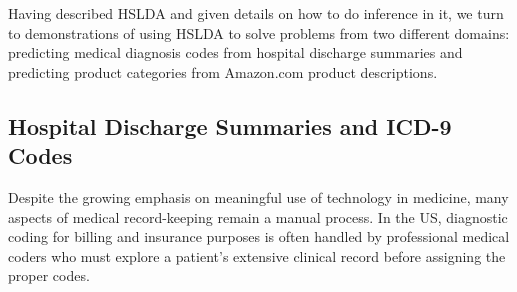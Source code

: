 Having described HSLDA and given details on how to do inference in it, we turn to demonstrations of using HSLDA to solve problems from  two different domains: predicting medical
diagnosis codes from hospital discharge summaries and predicting product
categories from Amazon.com product descriptions.


\subsection{Hospital Discharge Summaries and ICD-9 Codes}

 Despite the growing emphasis on meaningful
use of technology in medicine, many aspects of medical record-keeping
remain a manual process. In the US, diagnostic coding for billing and insurance
purposes is often handled by professional medical coders who must
explore a patient's extensive clinical record before assigning the
proper codes. %



